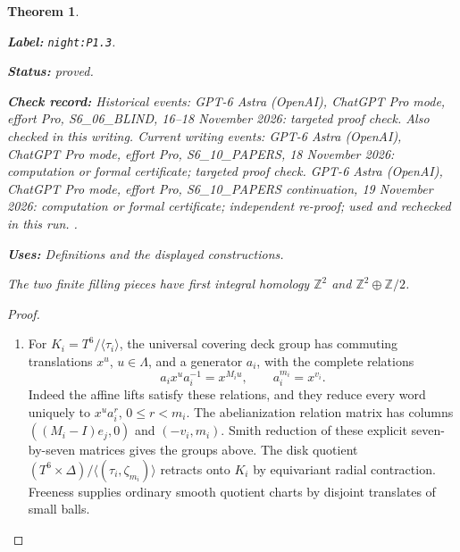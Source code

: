 \documentclass[11pt,a4paper]{article}
\newtheorem{theorem}{Theorem}[section]
\theoremstyle{definition}
\newcommand{\StatementRecord}[4]{\par\smallskip\begingroup\upshape\raggedright\noindent\textbf{Label:} \nolinkurl{#1}.\par\noindent\textbf{Status:} #2.\par\noindent\textbf{Check record:} #3.\par\noindent\textbf{Uses:} #4.\par\endgroup\smallskip}
\begin{document}
\begin{theorem}\label{night:P1.3}
\StatementRecord{night:P1.3}{proved}{Historical events: GPT-6 Astra (OpenAI), ChatGPT Pro mode, effort Pro, S6\_06\_BLIND, 16--18 November 2026: targeted proof check. Also checked in this writing. Current writing events: GPT-6 Astra (OpenAI), ChatGPT Pro mode, effort Pro, S6\_10\_PAPERS, 18 November 2026: computation or formal certificate; targeted proof check. GPT-6 Astra (OpenAI), ChatGPT Pro mode, effort Pro, S6\_10\_PAPERS continuation, 19 November 2026: computation or formal certificate; independent re-proof; used and rechecked in this run. }{Definitions and the displayed constructions}
The two finite filling pieces have first integral homology
$\mathbb Z^2$ and $\mathbb Z^2\oplus\mathbb Z/2$.
\end{theorem}
\begin{proof}
\begin{enumerate}[label=\arabic*.]
\item For $K_i=T^6/\langle\tau_i\rangle$, the universal covering deck group
has commuting translations $x^u$, $u\in\Lambda$, and a generator $a_i$,
with the complete relations
\[
a_ix^ua_i^{-1}=x^{M_iu},\qquad a_i^{m_i}=x^{v_i}.
\]
Indeed the affine lifts satisfy these relations, and they reduce every
word uniquely to $x^ua_i^r$, $0\leq r<m_i$.
The abelianization relation matrix has columns
$((M_i-I)e_j,0)$ and $(-v_i,m_i)$.
Smith reduction of these explicit seven-by-seven matrices gives the
groups above.  The disk quotient
$(T^6\times\Delta)/\langle(\tau_i,\zeta_{m_i})\rangle$
retracts onto $K_i$ by equivariant radial contraction.  Freeness supplies
ordinary smooth quotient charts by disjoint translates of small balls.

\end{enumerate}
\end{proof}
\end{document}
